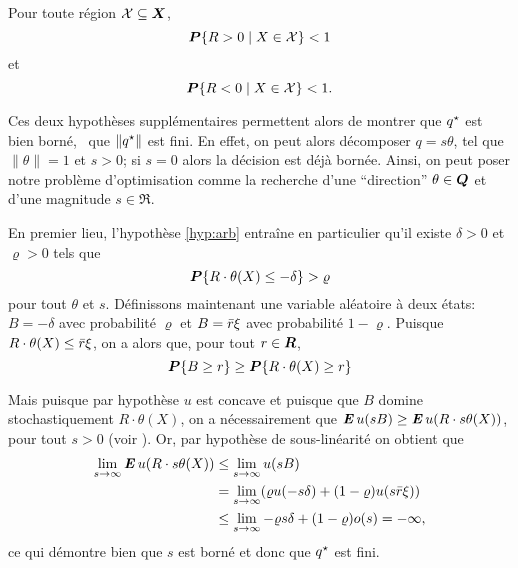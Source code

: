 \begin{assumption}
  \label{hyp:arb}
  Pour toute région $\mathcal{X}\subseteq\bm{X}$,
  \begin{equation}
    \bm P\{R > 0 \mid X \in \mathcal{X}\} < 1
  \end{equation}
  et
  \begin{equation}
    \bm P\{R < 0 \mid X \in \mathcal{X}\} < 1.
  \end{equation}
\end{assumption}

Ces deux hypothèses supplémentaires permettent alors de montrer que $q^\star$ est bien borné,
\ie\ que $\|q^\star\|$ est fini. En effet, on peut alors décomposer $q = s\theta$, tel que
$\|\theta\|=1$ et $s>0$; si $s=0$ alors la décision est déjà bornée. Ainsi, on peut poser notre
problème d'optimisation comme la recherche d'une ``direction'' $\theta \in \bm Q$ et d'une magnitude
$s \in \Re$.

En premier lieu, l'hypothèse \ref{hyp:arb} entraîne en particulier qu'il existe
$\delta > 0$ et $\varrho > 0$ tels que
\begin{equation}
  \bm P\{R\cdot\theta(X) \leq -\delta\} > \varrho
\end{equation}
pour tout $\theta$ et $s$.  Définissons maintenant une variable aléatoire à
deux états: $B = -\delta$ avec probabilité $\varrho$ et $B = \bar r\xi$ avec probabilité
$1-\varrho$. Puisque $R\cdot \theta(X) \leq \bar r\xi$, on a alors que, pour tout $r \in \bm{R}$,
\begin{equation}
  \bm P\{B\geq r\} \geq \bm P\{R\cdot \theta(X)\geq r\}
\end{equation}

Mais puisque par hypothèse $u$ est concave et puisque que $B$ domine stochastiquement
$R\cdot \theta(X)$, on a nécessairement que $\operatorname{\mbox{\textbf{\textit{E}}}} u(sB) \geq \operatorname{\mbox{\textbf{\textit{E}}}} u(R\cdot s\theta(X))$, pour tout
$s > 0$ (voir \cite{eeckhoudt2005economic}). Or, par hypothèse de sous-linéarité on
obtient que
\begin{align}
  \lim_{s\to\infty}\operatorname{\mbox{\textbf{\textit{E}}}} u(R\cdot s\theta(X)) &\leq \lim_{s\to\infty}u(sB)\\
                           & = \lim_{s\to\infty}(\varrho u(-s\delta) + (1-\varrho)u(s\bar r\xi))\\
                           & \leq\lim_{s\to\infty}-\varrho s \delta + (1-\varrho)o(s) = -\infty,
\end{align}
ce qui démontre bien que $s$ est borné et donc que $q^\star$ est fini.


